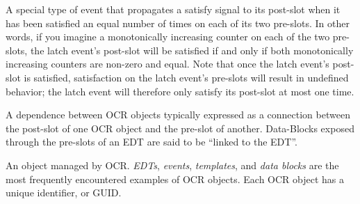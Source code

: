 \glossarydefstart
A special type of event that propagates a satisfy signal to its post-slot
when it has been satisfied an equal number of times on each of its two
pre-slots. In other words, if you imagine a
monotonically increasing counter on each of the two pre-slots, the
latch event's post-slot will be satisfied if and only if both monotonically
increasing counters are non-zero and equal. Note that once the latch
event's post-slot is satisfied, satisfaction on the latch event's
pre-slots will result in undefined behavior; the latch event will
therefore only satisfy its post-slot at most one time.
\glossarydefend

%
%

%
%


\glossarydefstart
A dependence between OCR objects typically expressed as a connection
between the post-slot of one OCR object and the pre-slot of another.  Data-Blocks
exposed through the pre-slots of an EDT are said to be ``linked to the EDT''.
\glossarydefend


\glossarydefstart
An object managed by OCR. \emph{EDTs}, \emph{events},
\emph{templates}, and \emph{data blocks} are the most frequently
encountered examples of OCR objects. Each OCR object has a unique
identifier, or GUID.
\glossarydefend


